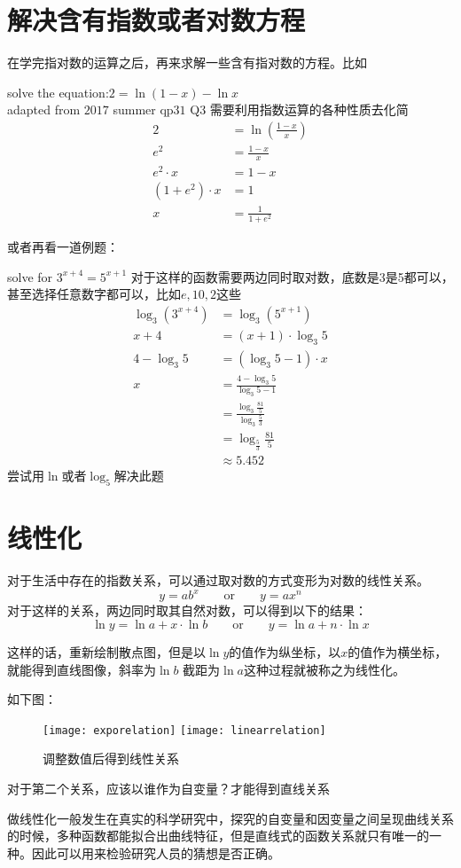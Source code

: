 \section{解决含有指数或者对数方程}
在学完指对数的运算之后，再来求解一些含有指对数的方程。比如
\begin{ExampleBox}
solve the equation:$2=\ln (1-x) -\ln x$\\
\makebox{}\hfill adapted from $2017$ summer qp$31$ Q$3$
\tcblower
需要利用指数运算的各种性质去化简
\begin{align*}
 	 2 &= \ln \left(\frac{1-x}{x}\right)\\
 	 e^2 &= \frac{1-x}{x} \\
 	 e^2\cdot x &= 1-x\\
 	 (1+e^2) \cdot x &=1\\
 	  x &=\frac{1}{1+e^2}
\end{align*}
\end{ExampleBox}

或者再看一道例题：
\begin{ExampleBox}
solve for $3^{x+4}=5^{x+1}$
\tcblower
对于这样的函数需要两边同时取对数，底数是3是5都可以，甚至选择任意数字都可以，比如$e, 10, 2$这些
\begin{align*}
 \log_3 {\left(3^{x+4}\right)} &=\log_3 {\left(5^{x+1}\right)}\\
 x+4 &=(x+1)\cdot \log_3 5\\
 4-\log_3 5 &=(\log_3 5-1)\cdot x\\
 x &=\frac{4-\log_3 5}{\log_3 5-1}\\
   &=\frac{\log_3 {\frac{81}{5}}}{\log_3 {\frac{5}{3}}}\\
   &=\log_{\frac{5}{3}} {\frac{81}{5}}\\
   &\approx 5.452
\end{align*}
尝试用$\ln$或者$\log_5$解决此题
\end{ExampleBox}
\clearpage


\section{线性化}
对于生活中存在的指数关系，可以通过取对数的方式变形为对数的线性关系。
\[
	y=ab^x \qquad \text{or} \qquad y=ax^n
\]
对于这样的关系，两边同时取其自然对数，可以得到以下的结果：
\[
	\ln y=\ln a+ x\cdot \ln b \qquad \text{or} \qquad y=\ln a+ n\cdot \ln x
\]

这样的话，重新绘制散点图，但是以$\ln y$的值作为纵坐标，以$x$的值作为横坐标，就能得到直线图像，斜率为$\ln b$ 截距为$\ln a$这种过程就被称之为线性化。

如下图：
\begin{figure}[H]
\centering
\texttt{[image: exporelation]}
\texttt{[image: linearrelation]}
\caption{调整数值后得到线性关系}
\end{figure}

\begin{TaskBox}
对于第二个关系，应该以谁作为自变量？才能得到直线关系
\end{TaskBox}

做线性化一般发生在真实的科学研究中，探究的自变量和因变量之间呈现曲线关系的时候，多种函数都能拟合出曲线特征，但是直线式的函数关系就只有唯一的一种。因此可以用来检验研究人员的猜想是否正确。


